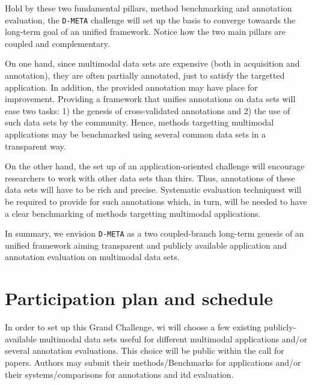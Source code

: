 \documentclass{sig-alternate}
\begin{document}
Hold by these two fundamental pillars, method benchmarking and annotation evaluation, the \texttt{D-META} challenge
will set up the basis to converge towaards the long-term goal of an unified framework. Notice how the two main pillars
are coupled and complementary.\vspace{0.3cm}

On one hand, since multimodal data sets are expensive (both in acquisition and annotation), they are often partially
annotated, just to satisfy the targetted application. In addition, the provided annotation may have place for
improvement. Providing a framework that unifies annotations on data sets will ease two tasks: 1) the genesis of
cross-validated annotations and 2) the use of such data sets by the community. Hence, methods targetting multimodal
applications may be benchmarked using several common data sets in a transparent way.\vspace{0.3cm}

On the other hand, the set up of an application-oriented challenge will encourage researchers to work with other data
sets than thirs. Thus, annotations of these data sets will have to be rich and precise. Systematic evaluation
techniquest will be required to provide for such annotations which, in turn, will be needed to have a clear
benchmarking of methods targetting multimodal applications.\vspace{0.3cm}

In summary, we envision \texttt{D-META} as a two coupled-branch long-term genesis of an unified framework aiming
transparent and publicly available application and annotation evaluation on multimodal data sets.

\section{Participation plan and schedule}
In order to set up this Grand Challenge, wi will choose a few existing publicly-available multimodal data sets useful
for different multimodal applications and/or several annotation evaluations. This choice will be public within the call
for papers. Authors may submit their methods/Benchmarks for applications and/or their systems/comparisons for
annotations and itd evaluation.\vspace{0.3cm}
\end{document}
